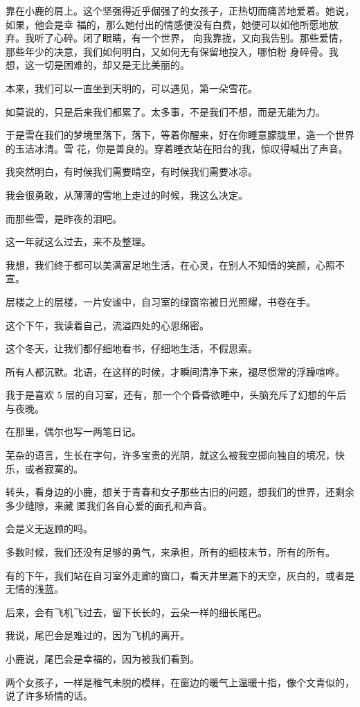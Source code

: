 		靠在小鹿的肩上。这个坚强得近乎倔强了的女孩子，正热切而痛苦地爱着。她说，如果，他会是幸
	福的，那么她付出的情感便没有白费，她便可以如他所愿地放弃。我听了心碎。闭了眼睛，有一个世界，
	向我靠拢，又向我告别。那些爱情，那些年少的决意，我们如何明白，又如何无有保留地投入，哪怕粉
	身碎骨。我想，这一切是困难的，却又是无比美丽的。


		本来，我们可以一直坐到天明的，可以遇见，第一朵雪花。

		如莫说的，只是后来我们都累了。太多事，不是我们不想，而是无能为力。

		于是雪在我们的梦境里落下，落下，等着你醒来，好在你睡意朦胧里，造一个世界的玉洁冰清。雪
	花，你是善良的。穿着睡衣站在阳台的我，惊叹得喊出了声音。


		我突然明白，有时候我们需要晴空，有时候我们需要冰凉。

		我会很勇敢，从薄薄的雪地上走过的时候，我这么决定。

		而那些雪，是昨夜的泪吧。

		这一年就这么过去，来不及整理。

	\endwriting



		我想，我们终于都可以美满富足地生活，在心灵，在别人不知情的笑颜，心照不宣。

		层楼之上的层楼，一片安谧中，自习室的绿窗帘被日光照耀，书卷在手。\par
		这个下午，我读着自己，流溢四处的心思绵密。\par
		这个冬天，让我们都仔细地看书，仔细地生活，不假思索。\par
		所有人都沉默。北语，在这样的时候，才瞬间清净下来，褪尽惯常的浮躁喧哗。\par
		我于是喜欢 5 层的自习室，还有，那一个个昏昏欲睡中，头脑充斥了幻想的午后与夜晚。

		在那里，偶尔也写一两笔日记。\par
		芜杂的语言，生长在字句，许多宝贵的光阴，就这么被我空掷向独自的境况，快乐，或者寂寞的。\par
		转头，看身边的小鹿，想关于青春和女子那些古旧的问题，想我们的世界，还剩余多少缝隙，来藏
	匿我们各自心爱的面孔和声音。\par
		会是义无返顾的吗。\par
		多数时候，我们还没有足够的勇气，来承担，所有的细枝末节，所有的所有。

		有的下午，我们站在自习室外走廊的窗口，看天井里漏下的天空，灰白的，或者是无情的浅蓝。\par
		后来，会有飞机飞过去，留下长长的，云朵一样的细长尾巴。\par
		我说，尾巴会是难过的，因为飞机的离开。\par
		小鹿说，尾巴会是幸福的，因为被我们看到。\par
		两个女孩子，一样是稚气未脱的模样，在窗边的暖气上温暖十指，像个文青似的，说了许多矫情的话。

